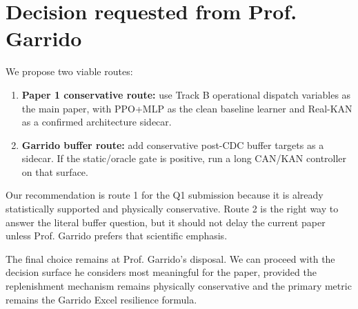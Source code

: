 \documentclass[11pt]{article}
\begin{document}
\section*{Decision requested from Prof. Garrido}

We propose two viable routes:

\begin{enumerate}[leftmargin=1.5em]
  \item \textbf{Paper 1 conservative route:} use Track B operational dispatch
  variables as the main paper, with PPO+MLP as the clean baseline learner and
  Real-KAN as a confirmed architecture sidecar.
  \item \textbf{Garrido buffer route:} add conservative post-CDC buffer targets
  as a sidecar. If the static/oracle gate is positive, run a long CAN/KAN
  controller on that surface.
\end{enumerate}

Our recommendation is route 1 for the Q1 submission because it is already
statistically supported and physically conservative. Route 2 is the right way
to answer the literal buffer question, but it should not delay the current paper
unless Prof. Garrido prefers that scientific emphasis.

The final choice remains at Prof. Garrido's disposal. We can proceed with the
decision surface he considers most meaningful for the paper, provided the
replenishment mechanism remains physically conservative and the primary metric
remains the Garrido Excel resilience formula.
\end{document}
